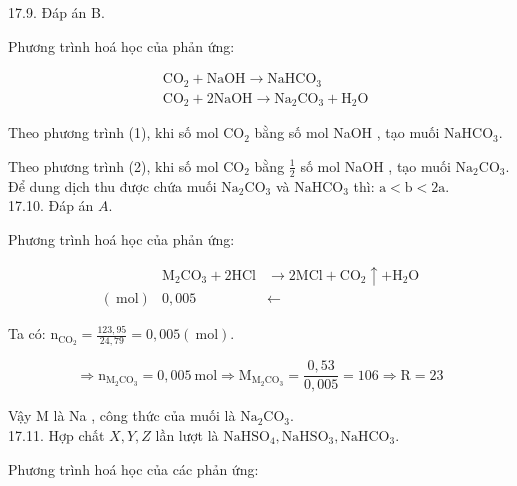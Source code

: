 \documentclass[10pt]{article}
\begin{document}
17.9. Đáp án B.

Phương trình hoá học của phản ứng:


\begin{align*}
& \mathrm{CO}_{2}+\mathrm{NaOH} \rightarrow \mathrm{NaHCO}_{3}  \tag{1}\\
& \mathrm{CO}_{2}+2 \mathrm{NaOH} \rightarrow \mathrm{Na}_{2} \mathrm{CO}_{3}+\mathrm{H}_{2} \mathrm{O} \tag{2}
\end{align*}


Theo phương trình (1), khi số mol $\mathrm{CO}_{2}$ bằng số mol NaOH , tạo muối $\mathrm{NaHCO}_{3}$.

Theo phương trình (2), khi số mol $\mathrm{CO}_{2}$ bằng $\frac{1}{2}$ số mol NaOH , tạo muối $\mathrm{Na}_{2} \mathrm{CO}_{3}$.\\
Để dung dịch thu được chứa muối $\mathrm{Na}_{2} \mathrm{CO}_{3}$ và $\mathrm{NaHCO}_{3}$ thì: $\mathrm{a}<\mathrm{b}<2 \mathrm{a}$.\\
17.10. Đáp án $A$.

Phương trình hoá học của phản ứng:

$$
\begin{array}{lll} 
& \mathrm{M}_{2} \mathrm{CO}_{3}+2 \mathrm{HCl} & \rightarrow 2 \mathrm{MCl}+\mathrm{CO}_{2} \uparrow+\mathrm{H}_{2} \mathrm{O} \\
(\mathrm{~mol}) & 0,005 & \leftarrow
\end{array}
$$

Ta có: $\mathrm{n}_{\mathrm{CO}_{2}}=\frac{123,95}{24,79}=0,005(\mathrm{~mol})$.

$$
\Rightarrow \mathrm{n}_{\mathrm{M}_{2} \mathrm{CO}_{3}}=0,005 \mathrm{~mol} \Rightarrow \mathrm{M}_{\mathrm{M}_{2} \mathrm{CO}_{3}}=\frac{0,53}{0,005}=106 \Rightarrow \mathrm{R}=23
$$

Vậy M là Na , công thức của muối là $\mathrm{Na}_{2} \mathrm{CO}_{3}$.\\
17.11. Hợp chất $X, Y, Z$ lần lượt là $\mathrm{NaHSO}_{4}, \mathrm{NaHSO}_{3}, \mathrm{NaHCO}_{3}$.

Phương trình hoá học của các phản ứng:
\end{document}
